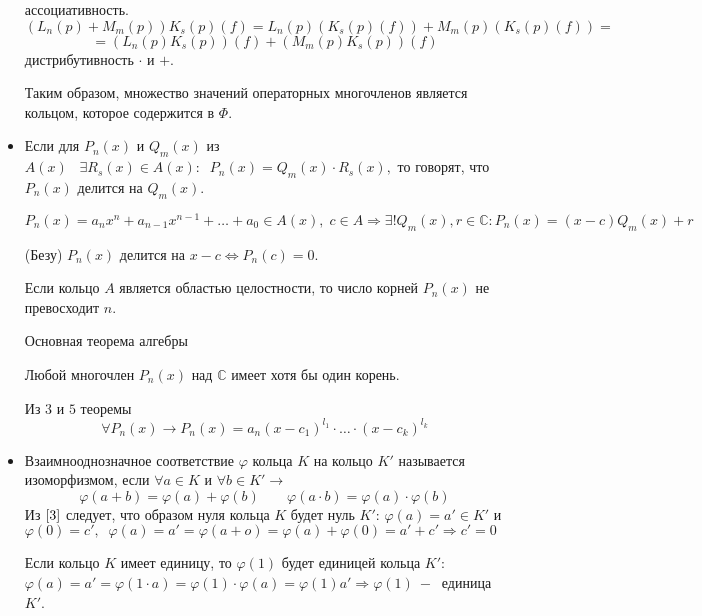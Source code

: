 \begin{itemize}
    ассоциативность. $$(L_n(p)+M_m(p))K_s(p)(f)=L_n(p)(K_s(p)(f))+M_m(p)(K_s(p)(f))= $$ 
    $$ = (L_n(p)K_s(p))(f)+(M_m(p)K_s(p))(f)$$дистрибутивность $\cdot $ и $+$.\par
    Таким образом, множество значений операторных многочленов является кольцом, которое содержится в $\varPhi$.
    \item Если для $P_n(x)$ и $Q_m(x)$ из $A(x)\;\;\;\exists R_s(x)\in A(x): \;\;P_n(x)=Q_m(x)\cdot R_s(x), $ то говорят, что $P_n(x)$ делится на $Q_m(x)$.
    \begin{theorem}
    $$P_n(x) = a_n x^n + a_{n-1} x^{n-1} + \dots + a_0 \in A(x), \;c \in A \Rightarrow \exists ! Q_m(x),  r\in \mathds{C}:P_n(x)=(x-c)Q_m(x)+r$$
    \end{theorem}
    \begin{theorem}
    (Безу) $P_n(x)$ делится на $x-c\Leftrightarrow P_n(c)=0$.
    \end{theorem}
    \begin{theorem}
    Если кольцо $A$ является областью целостности, то число корней $P_n(x)$ не превосходит $n$.
    \end{theorem}
    \begin{theorem}
    Основная теорема алгебры \par
    Любой многочлен $P_n(x)$ над $\mathds{C}$ имеет хотя бы один корень.
    \end{theorem}
    \begin{proposition}
    Из $3$ и $5$ теоремы \begin{equation}
        \forall P_n(x)\rightarrow P_n(x)=a_n(x-c_1)^{l_1}\cdot \dots
    \cdot (x-c_k)^{l_k} 
    \end{equation}
    \end{proposition}
    \item Взаимнооднозначное соответствие $\varphi$ кольца $K$ на кольцо $K'$ называется изоморфизмом, если $\forall a\in K $ и $\forall b\in K'\rightarrow$
    \begin{equation}
        \label{3}
        \varphi(a+b)=\varphi(a)+\varphi(b)\;\;\;\;\;\;\;\varphi(a\cdot b)=\varphi(a)\cdot\varphi(b)
    \end{equation}
    Из $\eqref{3}$ следует, что образом нуля кольца $K$ будет нуль $K'$: $\varphi(a)=a'\in K'$ и $\varphi(0)=c',\;\;\varphi(a)=a'=\varphi(a+o) = \varphi(a)+\varphi(0)=a'+c'\Rightarrow c'=0$\par
    Если кольцо $K$ имеет единицу, то $\varphi(1)$ будет единицей кольца $K'$: $\varphi(a)=a'=\varphi(1\cdot a )= \varphi(1)\cdot \varphi(a) = \varphi(1) a'\Rightarrow\varphi(1)~-~$ единица $K'$.

\end{itemize}
